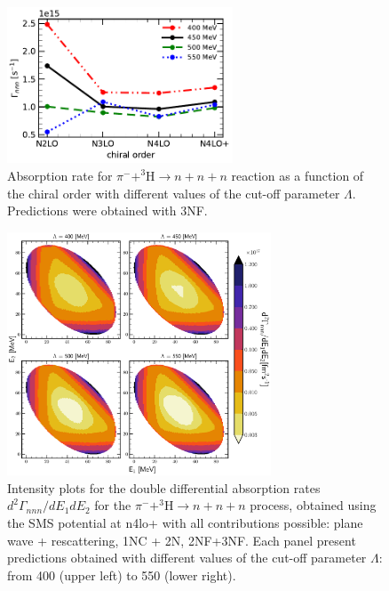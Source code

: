     \begin{figure}[h]
        \begin{center}
        \includegraphics[width=0.6\textwidth]{PlotData/PION/Dalitz_maps/figures/Gamma_nnn.pdf}
        \end{center}
        \caption{Absorption rate for $\pi^- + ^3\text{H} \rightarrow n + n + n$ reaction as a function
        of the chiral order with different values of the cut-off parameter $\Lambda$.
        Predictions were obtained with 3NF.}
        \label{Gamma_nnn}
    \end{figure}


    \begin{figure}[h]
        \begin{center}
        \includegraphics[width=0.7\textwidth]{PlotData/PION/Dalitz_maps/figures/Dalitz_map_nnn_E1E2_cutofs.pdf}
        \end{center}
        \caption{Intensity plots for the double differential absorption rates
        $d^2 \Gamma_{nnn}/dE_1dE_2$ for the $\pi^- + ^3\text{H} \rightarrow n + n + n$
        process, obtained using the SMS potential at \gls{n4lo+}
        with all contributions possible: plane wave + rescattering, 1NC + 2N, 2NF+3NF.
        Each panel present predictions obtained with different values of the cut-off parameter $\Lambda$:
        from \SI{400}{\mev} (upper left) to \SI{550}{\mev} (lower right).}
        \label{pion_nnn_E1E2_cutoff}
    \end{figure}

